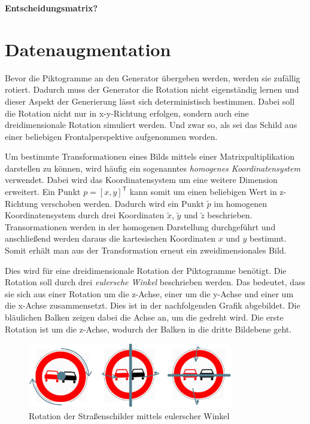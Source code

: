 \textbf{Entscheidungsmatrix?}

\section{Datenaugmentation}
Bevor die Piktogramme an den Generator übergeben werden, werden sie zufällig rotiert. Dadurch muss der Generator die Rotation nicht eigenständig lernen und dieser Aspekt der Generierung lässt sich deterministisch bestimmen. Dabei soll die Rotation nicht nur in x-y-Richtung erfolgen, sondern auch eine dreidimensionale Rotation simuliert werden. Und zwar so, als sei das Schild aus einer beliebigen Frontalperspektive aufgenommen worden.

Um bestimmte Transformationen eines Bilds mittels einer Matrixpultiplikation darstellen zu können, wird häufig ein sogenanntes \emph{homogenes Koordinatensystem} verwendet. Dabei wird das Koordinatensystem um eine weitere Dimension erweitert. Ein Punkt $p = [x, y]^\mathsf{T}$ kann somit um einen beliebigen Wert in z-Richtung verschoben werden. Dadurch wird ein Punkt $\tilde{p}$ im homogenen Koordinatensystem durch drei Koordinaten $\tilde{x}$, $\tilde{y}$ und $\tilde{z}$ beschrieben. Transormationen werden in der homogenen Darstellung durchgeführt und anschließend werden daraus die kartesischen Koordinaten $x$ und $y$ bestimmt. Somit erhält man aus der Transformation erneut ein zweidimensionales Bild. \cite{geometric-ops} \cite{math-primer}

Dies wird für eine dreidimensionale Rotation der Piktogramme benötigt. Die Rotation soll durch drei \emph{eulersche Winkel} beschrieben werden. Das bedeutet, dass sie sich aus einer Rotation um die z-Achse, einer um die y-Achse und einer um die x-Achse zusammensetzt. Dies ist in der nachfolgenden Grafik abgebildet. Die bläulichen Balken zeigen dabei die Achse an, um die gedreht wird. Die erste Rotation ist um die z-Achse, wodurch der Balken in die dritte Bildebene geht. \cite{math-primer}

\begin{figure}[H]
	\centering
	\includegraphics[width=0.8\textwidth]{../images/3 Konzeption des Generative Adversarial Networks/Datenaugmentation/Rotation.png}
	\caption{Rotation der Straßenschilder mittels eulerscher Winkel}
	\label{fig:rotation}
\end{figure}

